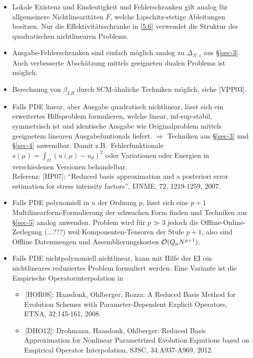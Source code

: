 \begin{bem} \beginwithlistbem
	\begin{itemize}
		\item Lokale Existenz und Eindeutigkeit und Fehlerschranken gilt analog für allgemeinere Nichtlinearitäten $F$, welche Lipschitz-stetige Ableitungen besitzen.
			Nur die Effektivitätsschranke in \ref{5.6} verwendet die Struktur des quadratischen nichtlinearen Problems.
		\item Ausgabe-Fehlerschranken sind einfach möglich analog zu $\Delta_{N,s}$ aus §\ref{sec-3}.
			Auch verbesserte Abschätzung mittels geeigneten dualen Problems ist möglich.
		\item Berechnung von $\beta_{LB}$ durch SCM-ähnliche Techniken möglich, siehe [VPP03].
		\item Falls PDE linear, aber Ausgabe quadratisch nichtlinear, lässt sich ein erweitertes Hilfsproblem formulieren, welche linear, inf-sup-stabil, symmetrisch ist und identische Ausgabe wie Originalproblem mittels geeignetem linearen Ausgabefuntionals liefert.
			$\Rightarrow$ Techniken aus §\ref{sec-3} und §\ref{sec-4} anwendbar.
			Damit z.B.\ Fehlerfunktionale $s(\mu) = \int_\Omega (u(\mu)-u_d)^2$ oder Variationen oder Energien in verschiedenen Versionen behandelbar.\\
			Referenz: [HP07]: ``Reduced basis approximation and a posteriori error estimation for stress intensity factors'', IJNME, 72, 1219-1259, 2007.
		\item Falls PDE polynomiell in $u$ der Ordnung $p$, lässt sich eine $p+1$ Multilinearform-Formulierung der schwachen Form finden und Techniken aus §\ref{sec-5} analog anwenden.
			Problem wird für $p \gg 3$ jedoch die Offline-Online-Zerlegung (...???) weil Komponenten-Tensoren der Stufe $p+1$, also sind Offline Datenmengen und Assemblierungskosten $\mathcal O(Q_a N^{p+1})$.
		\item Falls PDE nichtpolynomiell nichtlinear, kann mit Hilfe der EI ein nichtlineares reduziertes Problem formuliert werden.
			Eine Variante ist die Empirische Operatorinterpolation in
			\begin{itemize}
				\item \,[HOR08]: Haasdonk, Ohlberger, Rozza: A Reduced Basis Method for Evolution Schemes with Parameter-Dependent Explicit Operators, ETNA, 32:145-161, 2008.
				\item \,[DHO12]: Drohmann, Haasdonk, Ohlberger: Reduced Basis Approximation for Nonlinear Parametrized Evolution Equations based on Empirical Operator Interpolation, SJSC, 34:A937-A969, 2012.
			\end{itemize}
	\end{itemize}
\end{bem}
